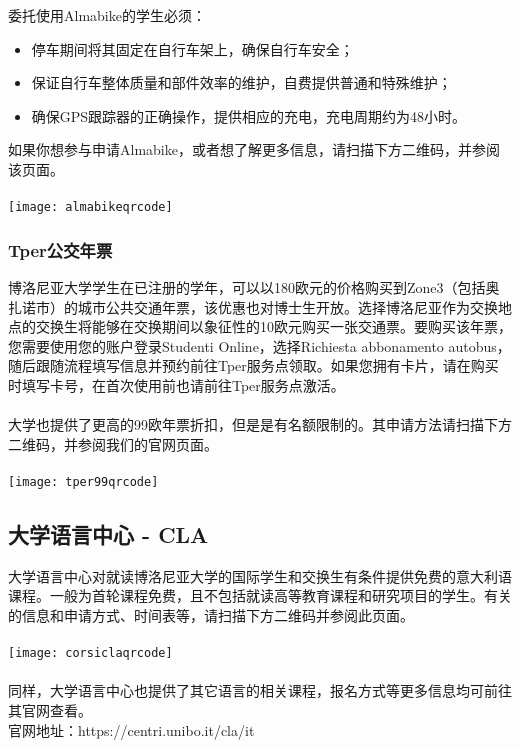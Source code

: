 委托使用Almabike的学生必须：
\begin{itemize}
 \item 停车期间将其固定在自行车架上，确保自行车安全；
 \item 保证自行车整体质量和部件效率的维护，自费提供普通和特殊维护； 
 \item 确保GPS跟踪器的正确操作，提供相应的充电，充电周期约为48小时。
\end{itemize}
如果你想参与申请Almabike，或者想了解更多信息，请扫描下方二维码，并参阅该页面。\\
\\
\texttt{[image: almabikeqrcode]}\\

\subsubsection{Tper公交年票}
博洛尼亚大学学生在已注册的学年，可以以180欧元的价格购买到Zone3（包括奥扎诺市）的城市公共交通年票，该优惠也对博士生开放。选择博洛尼亚作为交换地点的交换生将能够在交换期间以象征性的10欧元购买一张交通票。要购买该年票，您需要使用您的账户登录Studenti Online，选择Richiesta abbonamento autobus，随后跟随流程填写信息并预约前往Tper服务点领取。如果您拥有卡片，请在购买时填写卡号，在首次使用前也请前往Tper服务点激活。\\
\\
大学也提供了更高的99欧年票折扣，但是是有名额限制的。其申请方法请扫描下方二维码，并参阅我们的官网页面。\\
\\
\texttt{[image: tper99qrcode]}\\

\subsection{大学语言中心 - CLA}
大学语言中心对就读博洛尼亚大学的国际学生和交换生有条件提供免费的意大利语课程。一般为首轮课程免费，且不包括就读高等教育课程和研究项目的学生。有关的信息和申请方式、时间表等，请扫描下方二维码并参阅此页面。\\
\\
\texttt{[image: corsiclaqrcode]}\\
\\
同样，大学语言中心也提供了其它语言的相关课程，报名方式等更多信息均可前往其官网查看。\\
官网地址：https://centri.unibo.it/cla/it\\

